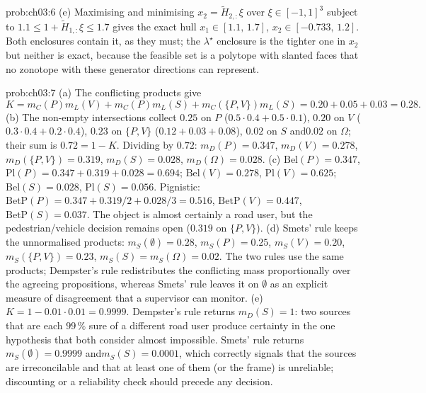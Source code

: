 \begin{sol}{prob:ch03:6}
(e) Maximising and minimising $x_2=\tilde H_{2,:}\xi$ over $\xi\in[-1,1]^{3}$ subject to $1.1\le1+\tilde H_{1,:}\xi\le1.7$ gives the exact hull $x_1\in[1.1,\,1.7]$, $x_2\in[-0.733,\,1.2]$. Both enclosures contain it, as they must; the $\lambda^{\star}$ enclosure is the tighter one in $x_2$ but neither is exact, because the feasible set is a polytope with slanted faces that no zonotope with these generator directions can represent.
\end{sol}

\begin{sol}{prob:ch03:7}
(a) The conflicting products give
\[K=m_C(P)m_L(V)+m_C(P)m_L(S)+m_C(\{P,V\})m_L(S)
=0.20+0.05+0.03=0.28.\]
(b) The non-empty intersections collect $0.25$ on $P$ ($0.5\cdot0.4+0.5\cdot0.1$), $0.20$ on $V$ ($0.3\cdot0.4+0.2\cdot0.4$), $0.23$ on $\{P,V\}$ ($0.12+0.03+0.08$), $0.02$ on $S$ and\allowbreak $0.02$ on $\Omega$; their sum is $0.72=1-K$. Dividing by $0.72$: $m_D(P)=0.347$, $m_D(V)=0.278$, $m_D(\{P,V\})=0.319$, $m_D(S)=0.028$, $m_D(\Omega)=0.028$.
(c) $\mathrm{Bel}(P)=0.347$, $\mathrm{Pl}(P)=0.347+0.319+0.028=0.694$; $\mathrm{Bel}(V)=0.278$, $\mathrm{Pl}(V)=0.625$; $\mathrm{Bel}(S)=0.028$, $\mathrm{Pl}(S)=0.056$. Pignistic: $\mathrm{BetP}(P)=0.347+0.319/2+0.028/3=0.516$, $\mathrm{BetP}(V)=0.447$, $\mathrm{BetP}(S)=0.037$. The object is almost certainly a road user, but the pedestrian/vehicle decision remains open ($0.319$ on $\{P,V\}$).
(d) Smets' rule keeps the unnormalised products: $m_S(\emptyset)=0.28$, $m_S(P)=0.25$, $m_S(V)=0.20$, $m_S(\{P,V\})=0.23$, $m_S(S)=m_S(\Omega)=0.02$. The two rules use the same products; Dempster's rule redistributes the conflicting mass proportionally over the agreeing propositions, whereas Smets' rule leaves it on $\emptyset$ as an explicit measure of disagreement that a supervisor can monitor.
(e) $K=1-0.01\cdot0.01=0.9999$. Dempster's rule returns $m_D(S)=1$: two sources that are each $99\,\%$ sure of a different road user produce certainty in the one hypothesis that both consider almost impossible. Smets' rule returns $m_S(\emptyset)=0.9999$ and\allowbreak $m_S(S)=0.0001$, which correctly signals that the sources are irreconcilable and that at least one of them (or the frame) is unreliable; discounting or a reliability check should precede any decision.
\end{sol}

